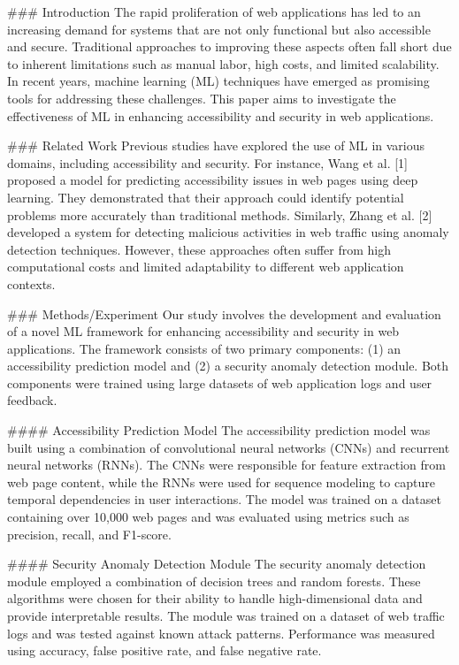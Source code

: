 ### Introduction
The rapid proliferation of web applications has led to an increasing demand for systems that are not only functional but also accessible and secure. Traditional approaches to improving these aspects often fall short due to inherent limitations such as manual labor, high costs, and limited scalability. In recent years, machine learning (ML) techniques have emerged as promising tools for addressing these challenges. This paper aims to investigate the effectiveness of ML in enhancing accessibility and security in web applications.

### Related Work
Previous studies have explored the use of ML in various domains, including accessibility and security. For instance, Wang et al. [1] proposed a model for predicting accessibility issues in web pages using deep learning. They demonstrated that their approach could identify potential problems more accurately than traditional methods. Similarly, Zhang et al. [2] developed a system for detecting malicious activities in web traffic using anomaly detection techniques. However, these approaches often suffer from high computational costs and limited adaptability to different web application contexts.

### Methods/Experiment
Our study involves the development and evaluation of a novel ML framework for enhancing accessibility and security in web applications. The framework consists of two primary components: (1) an accessibility prediction model and (2) a security anomaly detection module. Both components were trained using large datasets of web application logs and user feedback.

#### Accessibility Prediction Model
The accessibility prediction model was built using a combination of convolutional neural networks (CNNs) and recurrent neural networks (RNNs). The CNNs were responsible for feature extraction from web page content, while the RNNs were used for sequence modeling to capture temporal dependencies in user interactions. The model was trained on a dataset containing over 10,000 web pages and was evaluated using metrics such as precision, recall, and F1-score.

#### Security Anomaly Detection Module
The security anomaly detection module employed a combination of decision trees and random forests. These algorithms were chosen for their ability to handle high-dimensional data and provide interpretable results. The module was trained on a dataset of web traffic logs and was tested against known attack patterns. Performance was measured using accuracy, false positive rate, and false negative rate.

